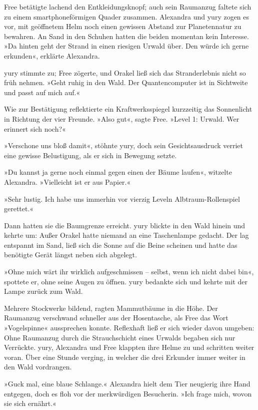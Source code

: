 Free betätigte lachend den Entkleidungsknopf; auch sein Raumanzug faltete sich zu einem smartphoneförmigen Quader zusammen. Alexandra und yury zogen es vor, mit geöffnetem Helm noch einen gewissen Abstand zur Planetennatur zu bewahren. An Sand in den Schuhen hatten die beiden momentan kein Interesse. »Da hinten geht der Strand in einen riesigen Urwald über. Den würde ich gerne erkunden«, erklärte Alexandra.

yury stimmte zu; Free zögerte, und Orakel ließ sich das Stranderlebnis nicht so früh nehmen. »Geht ruhig in den Wald. Der Quantencomputer ist in Sichtweite und passt auf mich auf.«

Wie zur Bestätigung reflektierte ein Kraftwerksspiegel kurzzeitig das Sonnenlicht in Richtung der vier Freunde. »Also gut«, sagte Free. »Level 1: Urwald. Wer erinnert sich noch?«

»Verschone uns bloß damit«, stöhnte yury, doch sein Gesichtsausdruck verriet eine gewisse Belustigung, als er sich in Bewegung setzte.

»Du kannst ja gerne noch einmal gegen einen der Bäume laufen«, witzelte Alexandra. »Vielleicht ist er aus Papier.«

»Sehr lustig. Ich habe uns immerhin vor vierzig Leveln Albtraum-Rollenspiel gerettet.«

Dann hatten sie die Baumgrenze erreicht. yury blickte in den Wald hinein und kehrte um: Außer Orakel hatte niemand an eine Taschenlampe gedacht. Der lag entspannt im Sand, ließ sich die Sonne auf die Beine scheinen und hatte das benötigte Gerät längst neben sich abgelegt.

»Ohne mich wärt ihr wirklich aufgeschmissen – selbst, wenn ich nicht dabei bin«, spottete er, ohne seine Augen zu öffnen. yury bedankte sich und kehrte mit der Lampe zurück zum Wald.

Mehrere Stockwerke bildend, ragten Mammutbäume in die Höhe. Der Raumanzug verschwand schneller aus der Hosentasche, als Free das Wort »Vogelspinne« aussprechen konnte. Reflexhaft ließ er sich wieder davon umgeben: Ohne Raumanzug durch die Strauchschicht eines Urwalds begaben sich nur Verrückte. yury, Alexandra und Free klappten ihre Helme zu und schritten weiter voran. Über eine Stunde verging, in welcher die drei Erkunder immer weiter in den Wald vordrangen.

»Guck mal, eine blaue Schlange.« Alexandra hielt dem Tier neugierig ihre Hand entgegen, doch es floh vor der merkwürdigen Besucherin. »Ich frage mich, wovon sie sich ernährt.«

